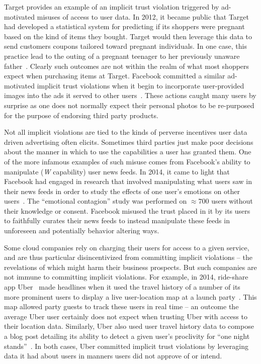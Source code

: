 Target provides an example of an implicit trust violation triggered by
ad-motivated misuses of access to user data. In 2012, it became public
that Target had developed a statistical system for predicting if its
shoppers were pregnant based on the kind of items they bought. Target
would then leverage this data to send customers coupons tailored
toward pregnant individuals. In one case, this practice lead to the
outing of a pregnant teenager to her previously unaware
father~\cite{hill2012}. Clearly such outcomes are not within the realm
of what most shoppers expect when purchasing items at Target. Facebook
committed a similar ad-motivated implicit trust violations when it
begin to incorporate user-provided images into the ads it served to
other users~\cite{mashable-socialads}. These actions caught many users
by surprise as one does not normally expect their personal photos to
be re-purposed for the purpose of endorsing third party products.

Not all implicit violations are tied to the kinds of perverse
incentives user data driven advertising often elicits. Sometimes third
parties just make poor decisions about the manner in which to use the
capabilities a user has granted them. One of the more infamous
examples of such misuse comes from Facebook's ability to manipulate
(\emph{W} capability) user news feeds. In 2014, it came to light that
Facebook had engaged in research that involved manipulating what users
saw in their news feeds in order to study the effects of one user's
emotions on other users~\cite{goel2014}. The ``emotional contagion''
study was performed on $\approx700$ users without their knowledge or
consent. Facebook misused the trust placed in it by its users to
faithfully curates their news feeds to instead manipulate these feeds
in unforeseen and potentially behavior altering ways.

Some cloud companies rely on charging their users for access to a
given service, and are thus particular disincentivized from committing
implicit violations -- the revelations of which might harm their
business prospects. But such companies are not immune to committing
implicit violations. For example, in 2014, ride-share app
Uber~\cite{uber} made headlines when it used the travel history of a
number of its more prominent users to display a live user-location map
at a launch party~\cite{sims2014}. This map allowed party guests to
track these users in real time -- an outcome the average Uber user
certainly does not expect when trusting Uber with access to their
location data. Similarly, Uber also used user travel history data to
compose a blog post detailing its ability to detect a given user's
proclivity for ``one night stands''~\cite{pagliery2014}. In both
cases, Uber committed implicit trust violations by leveraging data it
had about users in manners users did not approve of or intend.

